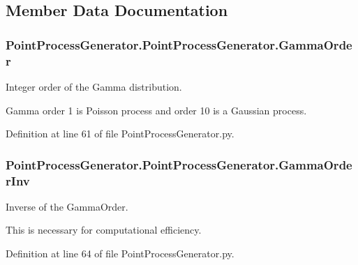 \subsection{Member Data Documentation}
\subsubsection[{\texorpdfstring{Gamma\+Order}{GammaOrder}}]{\setlength{\rightskip}{0pt plus 5cm}Point\+Process\+Generator.\+Point\+Process\+Generator.\+Gamma\+Order}\hypertarget{class_point_process_generator_1_1_point_process_generator_aa6c6513cd7f00dbdceb5f945a07cffee}{}\label{class_point_process_generator_1_1_point_process_generator_aa6c6513cd7f00dbdceb5f945a07cffee}


Integer order of the Gamma distribution. 

Gamma order 1 is Poisson process and order 10 is a Gaussian process. 

Definition at line 61 of file Point\+Process\+Generator.\+py.

\subsubsection[{\texorpdfstring{Gamma\+Order\+Inv}{GammaOrderInv}}]{\setlength{\rightskip}{0pt plus 5cm}Point\+Process\+Generator.\+Point\+Process\+Generator.\+Gamma\+Order\+Inv}\hypertarget{class_point_process_generator_1_1_point_process_generator_aa70be756b1535ff4512affa05a732fda}{}\label{class_point_process_generator_1_1_point_process_generator_aa70be756b1535ff4512affa05a732fda}


Inverse of the Gamma\+Order. 

This is necessary for computational efficiency. 

Definition at line 64 of file Point\+Process\+Generator.\+py.

